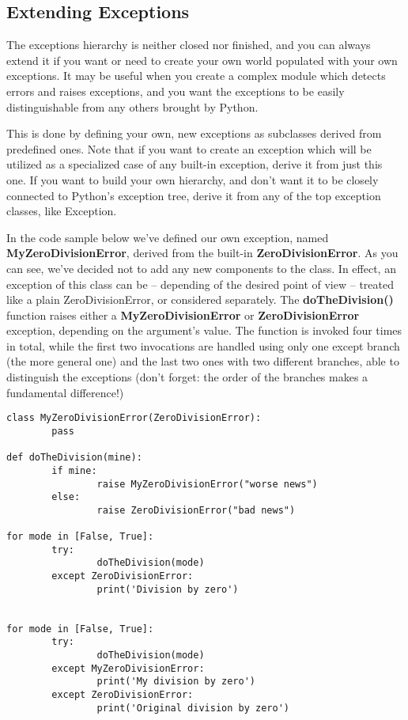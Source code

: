 \documentclass[11pt]{article}
\begin{document}
\subsection{Extending Exceptions}
\label{sec:orgf014ae3}
The exceptions hierarchy is neither closed nor finished, and you can
always extend it if you want or need to create your own world
populated with your own exceptions. It may be useful when you create a
complex module which detects errors and raises exceptions, and you
want the exceptions to be easily distinguishable from any others
brought by Python.

This is done by defining your own, new exceptions as subclasses
derived from predefined ones.  Note that if you want to create an
exception which will be utilized as a specialized case of any built-in
exception, derive it from just this one. If you want to build your own
hierarchy, and don’t want it to be closely connected to Python’s
exception tree, derive it from any of the top exception classes, like
Exception.

In the code sample below we’ve defined our own exception, named
\textbf{MyZeroDivisionError}, derived from the built-in
\textbf{ZeroDivisionError}. As you can see, we’ve decided not to add any new
components to the class. In effect, an exception of this class can be
– depending of the desired point of view – treated like a plain
ZeroDivisionError, or considered separately.  The \textbf{doTheDivision()}
function raises either a \textbf{MyZeroDivisionError} or \textbf{ZeroDivisionError}
exception, depending on the argument’s value. The function is invoked
four times in total, while the first two invocations are handled using
only one except branch (the more general one) and the last two ones
with two different branches, able to distinguish the exceptions (don’t
forget: the order of the branches makes a fundamental difference!)

\begin{verbatim}
class MyZeroDivisionError(ZeroDivisionError):
        pass

def doTheDivision(mine):
        if mine:
                raise MyZeroDivisionError("worse news")
        else:		
                raise ZeroDivisionError("bad news")

for mode in [False, True]:
        try:
                doTheDivision(mode)
        except ZeroDivisionError:
                print('Division by zero')


for mode in [False, True]:
        try:
                doTheDivision(mode)
        except MyZeroDivisionError:
                print('My division by zero')
        except ZeroDivisionError:
                print('Original division by zero')		
\end{verbatim}
\end{document}
